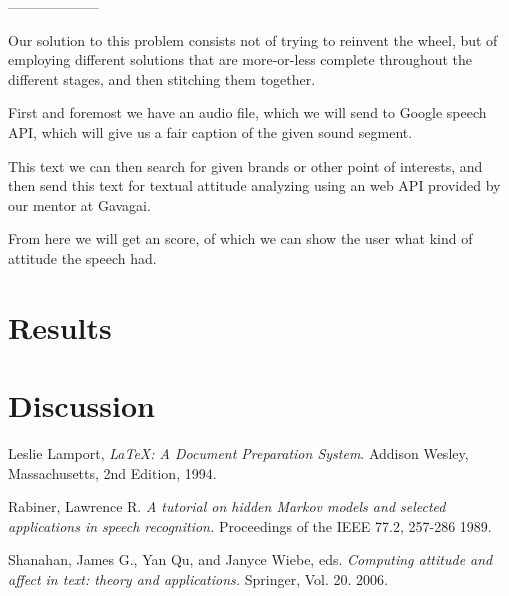 \documentclass[a4paper,12pt,twoside]{ltxdoc}
\begin{document}
--------------------

Our solution to this problem consists not of trying to reinvent the wheel, but of employing different
solutions that are more-or-less complete throughout the different stages, and then stitching them together.

First and foremost we have an audio file, which we will send to Google speech API, which will give us a fair caption of the given sound segment.

This text we can then search for given brands or other point of interests, and then send this text for textual attitude analyzing using an web API provided by our mentor at Gavagai.

From here we will get an score, of which we can show the user what kind of attitude the speech had. 

\section{Results}


\section{Discussion}


\newpage 

\begin{thebibliography}{9}

  Leslie Lamport,
  \emph{\LaTeX: A Document Preparation System}.
  Addison Wesley, Massachusetts,
  2nd Edition,
  1994.

Rabiner, Lawrence R.
\emph{A tutorial on hidden Markov models and selected applications in speech recognition.}
Proceedings of the IEEE 77.2,
257-286
1989.

  Shanahan, James G., Yan Qu, and Janyce Wiebe, eds.
  \emph{Computing attitude and affect in text: theory and applications.}
  Springer, 
  Vol. 20.
  2006.

\end{thebibliography}
\end{document}
